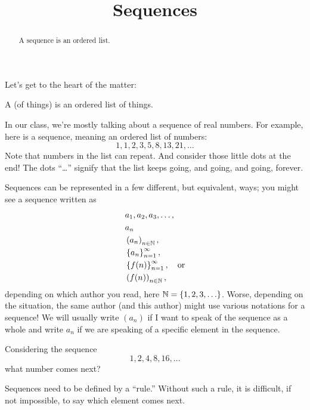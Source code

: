 \documentclass{ximera}
\title[Dig-In:]{Sequences}
\begin{document}
\begin{abstract}
  A sequence is an ordered list.
\end{abstract}
\maketitle


Let's get to the heart of the matter:

\begin{definition}
  A  (of things) is an ordered list of things.
\end{definition}

In our class, we're mostly talking about a sequence of real numbers.
For example, here is a sequence, meaning an ordered list of numbers:
\[
1,1, 2, 3, 5, 8, 13, 21, \ldots
\]
Note that numbers in the list can repeat.  And consider those little
dots at the end!  The dots ``\ldots'' signify that the list keeps
going, and going, and going, forever.

Sequences can be represented in a few different, but equivalent, ways;
you might see a sequence written as
\begin{align*}
  & a_1, a_2,  a_3, \ldots, \\
  & a_n \\
  & \left(a_n\right)_{n \in \mathbb N}, \\
  & \left\{a_n\right\}_{n=1}^\infty, \\
  & \left\{f(n)\right\}_{n=1}^\infty, \quad \text{or} \\
  & \left(f(n)\right)_{n \in \mathbb N},
\end{align*}
depending on which author you read, here $\mathbb N=\{1,2,3,\ldots\}$.  Worse, depending on the
situation, the same author (and this author) might use various
notations for a sequence!  We will usually write $(a_n)$ if I want to
speak of the sequence as a whole and write $a_n$ if we are speaking of
a specific element in the sequence.


\begin{question}
  Considering the sequence
  \[
  1, 2, 4, 8, 16, \dots
  \]
  what number comes next?
  \begin{multipleChoice}
  \end{multipleChoice}
  \begin{feedback}
    Sequences need to be defined by a ``rule.'' Without such a rule,
    it is difficult, if not impossible, to say which element comes
    next.
  \end{feedback}
\end{question}
\end{document}
